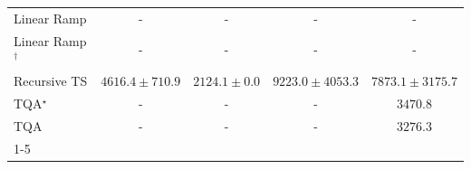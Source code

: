 \begin{tabular}{l|cccc|}
Linear Ramp & {\cellcolor[HTML]{000000}} \color[HTML]{F1F1F1} {\cellcolor{white}} \color{black} - & {\cellcolor[HTML]{000000}} \color[HTML]{F1F1F1} {\cellcolor{white}} \color{black} - & {\cellcolor[HTML]{000000}} \color[HTML]{F1F1F1} {\cellcolor{white}} \color{black} - & {\cellcolor[HTML]{000000}} \color[HTML]{F1F1F1} {\cellcolor{white}} \color{black} - \\
Linear Ramp$^\dagger$ & {\cellcolor[HTML]{000000}} \color[HTML]{F1F1F1} {\cellcolor{white}} \color{black} - & {\cellcolor[HTML]{000000}} \color[HTML]{F1F1F1} {\cellcolor{white}} \color{black} - & {\cellcolor[HTML]{000000}} \color[HTML]{F1F1F1} {\cellcolor{white}} \color{black} - & {\cellcolor[HTML]{000000}} \color[HTML]{F1F1F1} {\cellcolor{white}} \color{black} - \\
Recursive TS & {\cellcolor[HTML]{9FBAD9}} \color[HTML]{000000} $4616.4\pm 710.9$ & {\cellcolor[HTML]{F5EEF6}} \color[HTML]{000000} $2124.1\pm 0.0$ & {\cellcolor[HTML]{023A5B}} \color[HTML]{F1F1F1} $9223.0\pm 4053.3$ & {\cellcolor[HTML]{04649E}} \color[HTML]{F1F1F1} $7873.1\pm 3175.7$ \\
TQA$^\star$ & {\cellcolor[HTML]{000000}} \color[HTML]{F1F1F1} {\cellcolor{white}} \color{black} - & {\cellcolor[HTML]{000000}} \color[HTML]{F1F1F1} {\cellcolor{white}} \color{black} - & {\cellcolor[HTML]{000000}} \color[HTML]{F1F1F1} {\cellcolor{white}} \color{black} - & {\cellcolor[HTML]{D2D3E7}} \color[HTML]{000000} $3470.8$ \\
TQA & {\cellcolor[HTML]{000000}} \color[HTML]{F1F1F1} {\cellcolor{white}} \color{black} - & {\cellcolor[HTML]{000000}} \color[HTML]{F1F1F1} {\cellcolor{white}} \color{black} - & {\cellcolor[HTML]{000000}} \color[HTML]{F1F1F1} {\cellcolor{white}} \color{black} - & {\cellcolor[HTML]{D8D7E9}} \color[HTML]{000000} $3276.3$ \\
\cline{1-5}
\bottomrule
\end{tabular}

